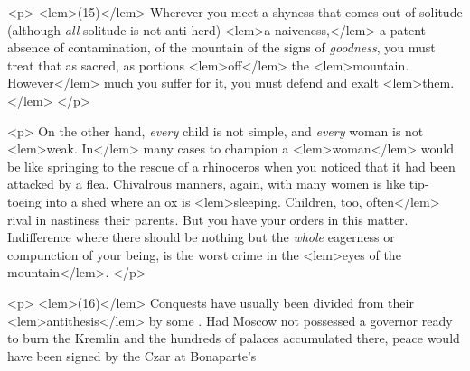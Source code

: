 {{				<p>
				\vspace{10pt}
				\noindent
<lem>(15)</lem>{}\hspace{20pt} Wherever 
				you meet a shyness that comes out of solitude (although \emph{all} solitude 
				is not anti-herd) 
<lem>a naiveness,</lem> 
					{}
				a patent absence of contamination,  
					{}
				of the mountain  
					{}
				of the signs of \emph{goodness}, you must treat that as sacred, as portions 
<lem>off</lem> 
					{}
				the 
<lem>mountain. However</lem> 
					{}
				much you suffer for it, you must defend and exalt 
<lem>them.</lem> 
					{}
 				</p> 

				<p>
				On the other hand, \emph{every} child is not simple, and \emph{every} woman is not 
<lem>weak. In</lem> 
					{}
				many cases 
				to champion a 
<lem>woman</lem> 
					{}
				would be like springing to the rescue of a rhinoceros when you 
				noticed that it had been attacked by a flea. Chivalrous manners, again, with many 
				women is like tip-toeing into a shed where an ox is 
<lem>sleeping. Children, too, often</lem>
					{}
				rival in nastiness their parents. But you have your orders in this matter. Indifference 
				where there should be nothing but the \emph{whole} eagerness or compunction of your being, 
				is the worst crime in the 
<lem>eyes of the mountain</lem>{}. 
 				</p> 

				<p>
				\vspace{10pt}
				\noindent
<lem>(16)</lem>{}\hspace{20pt} Conquests have usually 
				been divided from their 
<lem>antithesis</lem> 
					{}
				by some . Had Moscow not possessed a governor ready to burn the Kremlin 
				and the hundreds 
				of palaces accumulated there, peace would have been signed by the Czar at Bonaparte's 
				
}}
